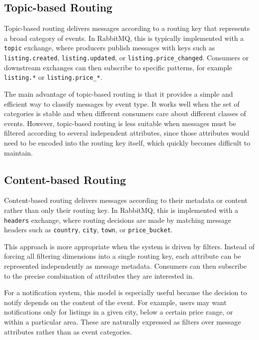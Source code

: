 \subsection{Topic-based Routing}

Topic-based routing delivers messages according to a routing key that represents a broad category of events. In RabbitMQ, this is typically implemented with a \texttt{topic} exchange, where producers publish messages with keys such as \texttt{listing.created}, \texttt{listing.updated}, or \texttt{listing.price\_changed}. Consumers or downstream exchanges can then subscribe to specific patterns, for example \texttt{listing.*} or \texttt{listing.price\_*}.

The main advantage of topic-based routing is that it provides a simple and efficient way to classify messages by event type. It works well when the set of categories is stable and when different consumers care about different classes of events. However, topic-based routing is less suitable when messages must be filtered according to several independent attributes, since those attributes would need to be encoded into the routing key itself, which quickly becomes difficult to maintain.

\subsection{Content-based Routing}

Content-based routing delivers messages according to their metadata or content rather than only their routing key. In RabbitMQ, this is implemented with a \texttt{headers} exchange, where routing decisions are made by matching message headers such as \texttt{country}, \texttt{city}, \texttt{town}, or \texttt{price\_bucket}.

This approach is more appropriate when the system is driven by filters. Instead of forcing all filtering dimensions into a single routing key, each attribute can be represented independently as message metadata. Consumers can then subscribe to the precise combination of attributes they are interested in.

For a notification system, this model is especially useful because the decision to notify depends on the content of the event. For example, users may want notifications only for listings in a given city, below a certain price range, or within a particular area. These are naturally expressed as filters over message attributes rather than as event categories.

